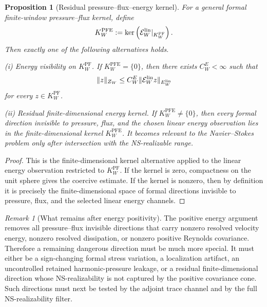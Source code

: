 \documentclass[11pt]{article}
\numberwithin{equation}{section}
\theoremstyle{plain}
\newtheorem{proposition}[theorem]{Proposition}
\theoremstyle{definition}
\theoremstyle{remark}
\newtheorem{remark}[theorem]{Remark}
\newcommand{\PF}{\mathrm{PF}}
\newcommand{\PFE}{\mathrm{PFE}}
\begin{document}
\begin{proposition}[Residual pressure--flux--energy kernel]
\label{prop:residual-pfe-kernel}
For a general formal finite-window pressure--flux kernel, define
\begin{equation}
        K^{\PFE}_W
        :=
        \ker\left(\mathcal E^{\rm lin}_W|_{K^{\PF}_W}\right).
        \label{eq:formal-pfe-kernel}
\end{equation}
Then exactly one of the following alternatives holds.

\smallskip
\noindent\textup{(i) Energy visibility on \(K^{\PF}_W\).}
If \(K^{\PFE}_W=\{0\}\), then there exists \(C^E_W<\infty\) such that
\[
        \|z\|_{Z_W}
        \le
        C^E_W\|\mathcal E^{\rm lin}_Wz\|_{E^{\rm lin}_W}
\]
for every \(z\in K^{\PF}_W\).

\smallskip
\noindent\textup{(ii) Residual finite-dimensional energy kernel.}
If \(K^{\PFE}_W\neq\{0\}\), then every formal direction invisible to pressure,
flux, and the chosen linear energy observation lies in the finite-dimensional
kernel \(K^{\PFE}_W\).  It becomes relevant to the Navier--Stokes problem only
after intersection with the NS-realizable range.
\end{proposition}

\begin{proof}
This is the finite-dimensional kernel alternative applied to the linear energy
observation restricted to \(K^{\PF}_W\).  If the kernel is zero, compactness on
the unit sphere gives the coercive estimate.  If the kernel is nonzero, then by
definition it is precisely the finite-dimensional space of formal directions
invisible to pressure, flux, and the selected linear energy channels.
\end{proof}

\begin{remark}[What remains after energy positivity]
The positive energy argument removes all pressure--flux invisible directions that carry nonzero resolved velocity energy, nonzero resolved dissipation, or nonzero positive Reynolds covariance.  Therefore a remaining dangerous direction must be much more special.  It must either be a sign-changing formal stress variation, a localization artifact, an uncontrolled retained harmonic-pressure leakage, or a residual finite-dimensional direction whose NS-realizability is not captured by the positive covariance cone.  Such directions must next be tested by the adjoint trace channel and by the full NS-realizability filter.
\end{remark}
\end{document}
